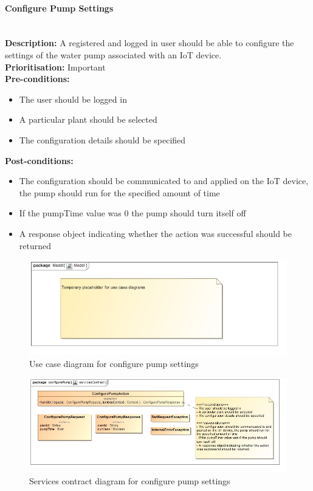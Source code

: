 \documentclass{article}
\begin{document}
	\paragraph{Configure Pump Settings}\mbox{}\\
		\textbf{Description:} A registered and logged in user should be able to configure the settings of the water pump associated with an IoT device.\\
		\textbf{Prioritisation:} Important\\		
		\textbf{Pre-conditions:}
			\begin{itemize}
				\item The user should be logged in
				\item A particular plant should be selected
				\item The configuration details should be specified
			\end{itemize}
		\textbf{Post-conditions:}
			\begin{itemize}
				\item The configuration should be communicated to and applied on the IoT device, the pump should run for the specified amount of time
				\item If the pumpTime value was 0 the pump should turn itself off
				\item A response object indicating whether the action was successful should be returned
			\end{itemize}

		\begin{figure}[H]
			\includegraphics[width=\linewidth]{images/tempUseCase.jpg}
			\caption{Use case diagram for configure pump settings}
		\end{figure}
		
		\begin{figure}[H]
			\includegraphics[width=\linewidth]{images/ServicesContracts/configurePump.jpg}
			\caption{Services contract diagram for configure pump settings}
		\end{figure}
	
\end{document}
